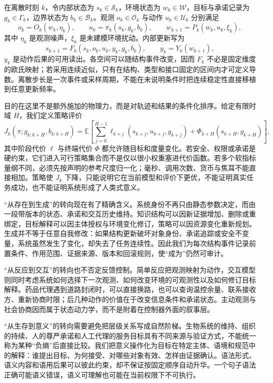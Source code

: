 在离散时刻 $k$，令内部状态为 $s_k\in\mathcal S_k$，环境状态为 $w_k\in\mathcal W$，目标与承诺记录为 $g_k\in\Gamma_k$，边界状态为 $b_k\in\mathcal B_k$。观测 $o_k\in\mathcal O_k$ 与动作 $u_k\in\mathcal U_k$ 分别满足
\begin{equation}
  o_k=O_k(w_k,\eta_k),\qquad
  u_k=\pi_k(s_k,g_k,b_k),\qquad
  w_{k+1}=P_k(w_k,u_k,\xi_k),
\end{equation}
其中 $\eta_k$ 是观测噪声，$\xi_k$ 是未建模环境扰动。内部更新写为
\begin{equation}
  s_{k+1}=F_k(s_k,o_k,u_k,y_k,g_k,b_k),
  \qquad y_k=Y_k(w_{k+1}),
\end{equation}
$y_k$ 是动作后果的可用读出。各空间可以随结构事件改变，因而 $F_k$ 不必是固定维度的欧氏映射；若采用连续近似，只有在结构、类型和接口固定的区间内才可定义导数。离散步长是一次事件或采样周期，不能在未说明条件时把连续稳定性直接移植到任意更新频率。

目的在这里不是额外施加的物理力，而是对轨迹和结果的条件化排序。给定有限时域 $H$，我们定义策略评价
\begin{equation}
  J_k(\pi;g_{k:k+H},b_{k:k+H})
  =\mathbb E\!\left[
  \sum_{j=0}^{H-1}\ell_{k+j}(s_{k+j},u_{k+j},g_{k+j})
  +\Phi_{k+H}(s_{k+H},g_{k+H})
  \right],
\end{equation}
其中阶段代价 $\ell$ 与终端代价 $\Phi$ 都允许随目标和度量变化。若安全、权限或承诺是硬约束，它们进入可行策略集合而不是仅以很小权重塞进代价函数。若多个软指标量纲不同，必须先按声明的参考尺度归一化；毫秒、调用次数、货币与焦耳不能直接相加。策略使 $J_k$ 下降，只能说明它在当前模型和评价下更优，不能证明真实任务成功，也不能证明系统形成了人类式意义。

“从存在到生成”的转向现在有了精确含义。系统身份不再只由静态参数决定，而由一段带版本的状态、承诺和交互历史维持。知识结构可以因新证据增加、删除或重绑定，目标解释可以因主体授权与环境变化修订，策略可以因资源变化重新规划。生成并不等于任意自我修改：如果结构更新破坏对象身份、承诺追踪或安全不变量，系统虽然发生了变化，却失去了任务连续性。因此我们为每次结构事件记录前置条件、作用范围、证据来源、版本和回滚规则，使“成为”仍然可审计。

“从反应到交互”的转向也不否定反馈控制。简单反应把观测映射为动作，交互模型则同时考虑系统如何选择下一次观测、如何改变环境的可观测性以及如何修订目标解释。药品代理遇到道路封闭时，可以直接换路，也可以查询温控余量、联系接收方、重新协商时限；后几种动作的价值在于改变信息条件和承诺状态。主动观测与社会协商因而属于状态动力学，而不是附着在控制器外面的叙事层。

“从生存到意义”的转向需要避免把层级关系写成自然阶梯。生物系统的维持、组织的持续、人的尊严承诺和人工代理的服务目标具有不同来源与验证方式，不能统一称为某种“负熵”后直接比较。我们把意义操作化为目标在特定主体、语境和规范中的解释：谁提出目标、为何接受、对哪些对象有效、怎样由证据确认。语法形式、语义内容和语用后果可以彼此约束，却不保证按固定顺序自动升华。一个句子语法正确可能语义错误，语义可理解也可能在当前权限下不可执行。

